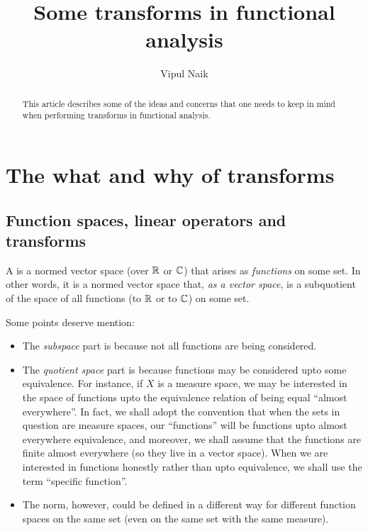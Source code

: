 \documentclass[a4paper]{amsart}
\title{Some transforms in functional analysis}
\author{Vipul Naik}
\begin{document}
\maketitle

\begin{abstract}
  This article describes some of the ideas and concerns that one needs
  to keep in mind when performing transforms in functional analysis.
\end{abstract}

\section{The what and why of transforms}

\subsection{Function spaces, linear operators and transforms}

A  is a normed vector space (over $\mathbb{R}$ or
$\mathbb{C}$) that arises as {\em functions} on some set. In other words, it
is a normed vector space that, {\em as a vector space}, is a
subquotient of the space of all functions (to $\mathbb{R}$ or to $\mathbb{C}$) on some
set.

Some points deserve mention:

\begin{itemize}

\item The {\em subspace} part is because not all functions are being
  considered.

\item The {\em quotient space} part is because functions may be
  considered upto some equivalence. For instance, if $X$ is a measure
  space, we may be interested in the space of functions upto the
  equivalence relation of being equal ``almost everywhere''. In fact,
  we shall adopt the convention that when the sets in question are
  measure spaces, our ``functions'' will be functions upto almost
  everywhere equivalence, and moreover, we shall assume that the
  functions are finite almost everywhere (so they live in a vector
  space).  When we are interested in functions honestly rather than
  upto equivalence, we shall use the term ``specific function''.

\item The norm, however, could be defined in a different way for
  different function spaces on the same set (even on the same set with
  the same measure).
\end{itemize}
\end{document}
